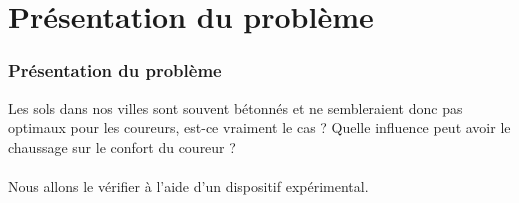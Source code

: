 \section{Présentation du problème}
\begin{frame}
    \frametitle{Présentation du problème}
    Les sols dans nos villes sont souvent bétonnés et ne sembleraient donc pas optimaux pour les coureurs, est-ce vraiment le cas ? Quelle influence peut avoir le chaussage sur le confort du coureur ?
    \\
    \\
    Nous allons le vérifier à l'aide d'un dispositif expérimental.
\end{frame}
